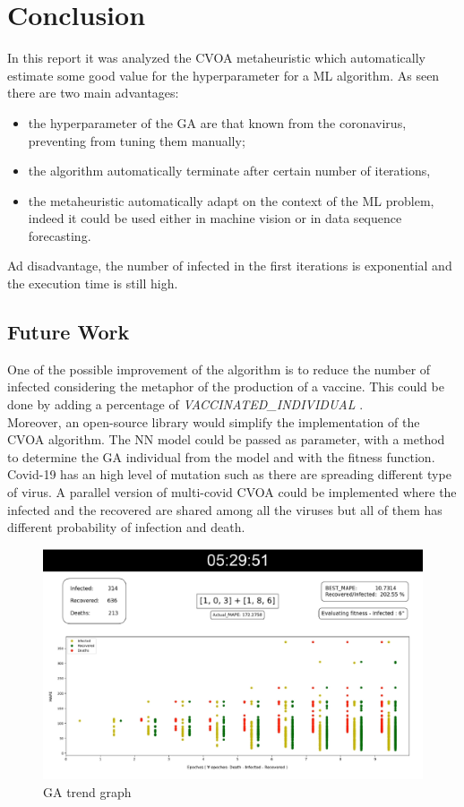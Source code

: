 \documentclass[letterpaper]{article}%
\begin{document}
\section{Conclusion}
In this report it was analyzed the CVOA metaheuristic which automatically estimate some good value for the hyperparameter for a ML algorithm. As seen there are two main advantages:
\begin{itemize}
	\item the hyperparameter of the GA are that known from the coronavirus, preventing from tuning them manually;
	\item the algorithm automatically terminate after certain number of iterations,
	\item the metaheuristic automatically adapt on the context of the ML problem, indeed it could be used either in machine vision or in data sequence forecasting.
\end{itemize}
Ad disadvantage, the number of infected in the first iterations is exponential and the execution time is still high.

\subsection{Future Work}
One of the possible improvement of the algorithm is to reduce the number of infected considering the metaphor of the production of a vaccine. This could be done by adding a percentage of  \textit{VACCINATED\_INDIVIDUAL} .\\
Moreover, an open-source library would simplify the implementation of the CVOA algorithm. The NN model could be passed as parameter, with a method to determine the GA individual from the model and with the fitness function.\\
Covid-19 has an high level of mutation such as there are spreading different type of virus. A parallel version of multi-covid CVOA could be implemented where the infected and the recovered are shared among all the viruses but all of them has different probability of infection and death.


\clearpage 
\onecolumn
\begin{figure}[!h]
	\includegraphics[width=\columnwidth]{img/GA_algorithm_iter10-resize}
	\caption{GA trend graph}
	\label{fig:GAgraph}
\end{figure}
\end{document}
